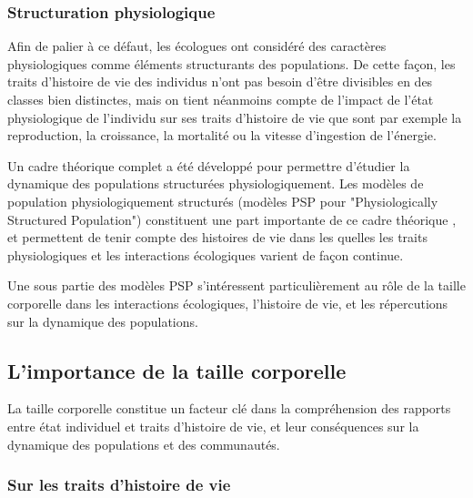 \subsubsection{Structuration physiologique}

Afin de palier à ce défaut, les écologues ont considéré des caractères
physiologiques comme éléments structurants des populations. De cette façon, les
traits d'histoire de vie des individus n'ont pas besoin d'être divisibles en des
classes bien distinctes, mais on tient néanmoins compte de l'impact de l'état
physiologique de l'individu sur ses traits d'histoire de vie que sont par
exemple la reproduction, la croissance, la mortalité ou la vitesse d'ingestion
de l'énergie. 

Un cadre théorique complet a été développé pour permettre d'étudier la dynamique
des populations structurées physiologiquement. Les modèles de
population physiologiquement structurés (modèles PSP pour "Physiologically
Structured Population") constituent une part importante de ce cadre théorique
\autocite{metz1986a,de-roos1992a,de-roos1997a}, et permettent de tenir compte
des histoires de vie dans les quelles les traits physiologiques et les
interactions écologiques varient de façon continue. 

Une sous partie des modèles PSP s'intéressent particulièrement au rôle de la
taille corporelle dans les interactions écologiques, l'histoire de vie, et les
répercutions sur la dynamique des populations. 

\subsection{L'importance de la taille corporelle}

La taille corporelle constitue un facteur clé dans la compréhension des rapports
entre état individuel et traits d'histoire de vie, et leur conséquences sur la
dynamique des populations et des communautés. 

\subsubsection{Sur les traits d'histoire de vie}

